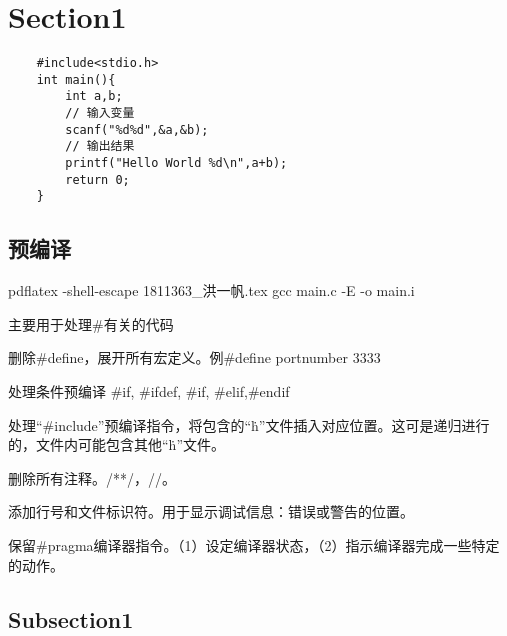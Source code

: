\documentclass{article}
\begin{document}
\renewcommand {\thefigure} {\thesection{}.\arabic{figure}}%
\renewcommand{\figurename}{图}
\renewcommand{\contentsname}{目录}           %


\title{}
\author{\ \ }
\date{September 2020}
\maketitle

\newpage
\tableofcontents

\newpage

\section{Section1}

\zhlipsum[1]
\begin{verbatim}
    #include<stdio.h>
    int main(){
        int a,b;
        // 输入变量
        scanf("%d%d",&a,&b);
        // 输出结果
        printf("Hello World %d\n",a+b);
        return 0;
    }
\end{verbatim}

\subsection{预编译}
pdflatex -shell-escape 1811363\_洪一帆.tex
gcc main.c -E -o main.i

主要用于处理\#有关的代码

删除\#define，展开所有宏定义。例\#define portnumber 3333

处理条件预编译 \#if, \#ifdef, \#if, \#elif,\#endif

处理“\#include”预编译指令，将包含的“\.h”文件插入对应位置。这可是递归进行的，文件内可能包含其他“\.h”文件。

删除所有注释。/**/，//。

添加行号和文件标识符。用于显示调试信息：错误或警告的位置。

保留\#pragma编译器指令。（1）设定编译器状态，（2）指示编译器完成一些特定的动作。


\subsection{Subsection1}
\end{document}
